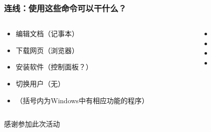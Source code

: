 \begin{CJK}{UTF8}{gbsn}
\begin{frame} [fragile]
	\frametitle{连线：使用这些命令可以干什么？}
	\linespread{1.5}
	\begin{columns}[T]
		\begin{column}[T]{.5\textwidth}
			\begin{itemize}
			\item 编辑文档（记事本）
			\item 下载网页（浏览器）
			\item 安装软件（控制面板？）
			\item 切换用户（无）
			\item （括号内为Windows中有相应功能的程序）
			\end{itemize}
		\end{column}
		\begin{column}[T]{.5\textwidth}
			\begin{itemize}
			\item {}
			\item {}
			\item {}
			\item {}
			\end{itemize}
		\end{column}
	\end{columns}
\end{frame}

\PreLastFrame
\begin{frame}
	\centerline{\fontsize{32}{32}\selectfont 感谢参加此次活动}
\end{frame}

\newpage
\end{CJK}


